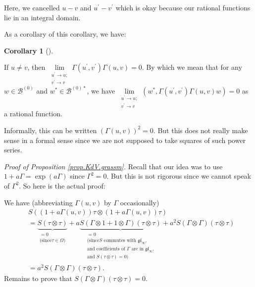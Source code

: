 \documentclass
[numbers=enddot,12pt,final,onecolumn,german,notitlepage]{scrartcl}%
\theoremstyle{definition}
\newtheorem{coro}[theo]{Corollary}
\newenvironment{corollary}[1][]
{\begin{coro}[#1]\begin{leftbar}}
{\end{leftbar}\end{coro}}
\begin{document}
Here, we cancelled $u-v$ and $u^{\prime}-v^{\prime}$ which is okay because our
rational functions lie in an integral domain.

As a corollary of this corollary, we have:

\begin{corollary}
If $u\neq v$, then $\lim\limits_{\substack{u^{\prime}\rightarrow
u;\\v^{\prime}\rightarrow v}}\Gamma\left(  u^{\prime},v^{\prime}\right)
\Gamma\left(  u,v\right)  =0$. By which we mean that for any $w\in
\mathcal{B}^{\left(  0\right)  }$ and $w^{\ast}\in\mathcal{B}^{\left(
0\right)  \ast}$, we have $\lim\limits_{\substack{u^{\prime}\rightarrow
u;\\v^{\prime}\rightarrow v}}\left(  w^{\ast},\Gamma\left(  u^{\prime
},v^{\prime}\right)  \Gamma\left(  u,v\right)  w\right)  =0$ as a rational function.
\end{corollary}

Informally, this can be written $\left(  \Gamma\left(  u,v\right)  \right)
^{2}=0$. But this does not really make sense in a formal sense since we are
not supposed to take squares of such power series.

\textit{Proof of Proposition \ref{prop.KdV.grassm}.} Recall that our idea was
to use $1+a\Gamma=\exp\left(  a\Gamma\right)  $ since $\Gamma^{2}=0$. But this
is not rigorous since we cannot speak of $\Gamma^{2}$. So here is the actual proof:

We have (abbreviating $\Gamma\left(  u,v\right)  $ by $\Gamma$ occasionally)%
\begin{align*}
&  S\left(  \left(  1+a\Gamma\left(  u,v\right)  \right)  \tau\otimes\left(
1+a\Gamma\left(  u,v\right)  \right)  \tau\right) \\
&  =\underbrace{S\left(  \tau\otimes\tau\right)  }_{\substack{=0\\\text{(since
}\tau\in\Omega\text{)}}}+a\underbrace{S\left(  \Gamma\otimes1+1\otimes
\Gamma\right)  \left(  \tau\otimes\tau\right)  }_{\substack{=0\\\text{(since
}S\text{ commutes with }\mathfrak{gl}_{\infty}\text{,}\\\text{and coefficients
of }\Gamma\text{ are in }\mathfrak{gl}_{\infty}\text{,}\\\text{and }S\left(
\tau\otimes\tau\right)  =0\text{)}}}+a^{2}S\left(  \Gamma\otimes\Gamma\right)
\left(  \tau\otimes\tau\right) \\
&  =a^{2}S\left(  \Gamma\otimes\Gamma\right)  \left(  \tau\otimes\tau\right)
.
\end{align*}
Remains to prove that $S\left(  \Gamma\otimes\Gamma\right)  \left(
\tau\otimes\tau\right)  =0$.
\end{document}
